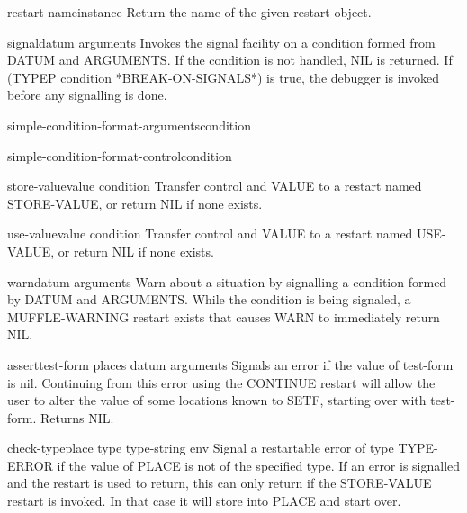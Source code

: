 \begin{function}{restart-name}{instance}{}{}
  Return the name of the given restart object.
\end{function}

\begin{function}{signal}{datum \rest arguments}{}{}
  Invokes the signal facility on a condition formed from DATUM and
   ARGUMENTS. If the condition is not handled, NIL is returned. If
   (TYPEP condition *BREAK-ON-SIGNALS*) is true, the debugger is invoked
   before any signalling is done.
\end{function}

\begin{function}{simple-condition-format-arguments}{condition}{}{}
  
\end{function}

\begin{function}{simple-condition-format-control}{condition}{}{}
  
\end{function}

\begin{function}{store-value}{value \op condition}{}{}
  Transfer control and VALUE to a restart named STORE-VALUE, or return NIL if
   none exists.
\end{function}

\begin{function}{use-value}{value \op condition}{}{}
  Transfer control and VALUE to a restart named USE-VALUE, or return NIL if
   none exists.
\end{function}

\begin{function}{warn}{datum \rest arguments}{}{}
  Warn about a situation by signalling a condition formed by DATUM and
   ARGUMENTS. While the condition is being signaled, a MUFFLE-WARNING restart
   exists that causes WARN to immediately return NIL.
\end{function}

\begin{macro}{assert}{test-form \op places datum \rest arguments}{}{}
  Signals an error if the value of test-form is nil. Continuing from this
   error using the CONTINUE restart will allow the user to alter the value of
   some locations known to SETF, starting over with test-form. Returns NIL.
\end{macro}

\begin{macro}{check-type}{place type \op type-string \env env}{}{}
  Signal a restartable error of type TYPE-ERROR if the value of PLACE
is not of the specified type. If an error is signalled and the restart
is used to return, this can only return if the STORE-VALUE restart is
invoked. In that case it will store into PLACE and start over.
\end{macro}


